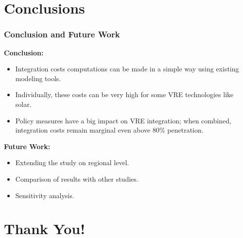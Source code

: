 \documentclass[aspectratio=169]{beamer}
\begin{document}
\section{Conclusions}

\begin{frame}[fragile]
  \frametitle{Conclusion and Future Work}

  \textbf{Conclusion:}
    \begin{itemize}
      \item {Integration costs computations can be made in a simple way using existing modeling tools.}
      \item {Individually, these costs can be very high for some VRE technologies like solar.}
      \item {Policy measures have a big impact on VRE integration; when combined, integration costs remain marginal even above 80\% penetration.}
    \end{itemize}

  \textbf{Future Work:}
    \begin{itemize}
      \item Extending the study on regional level.
       \item Comparison of results with other studies.
      \item Sensitivity analysis.
      
    \end{itemize}
\end{frame}




\section{Thank You!}
\end{document}
